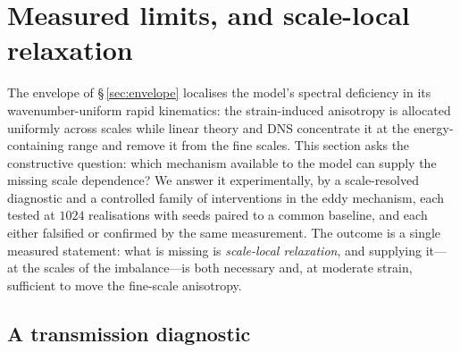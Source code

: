 \documentclass[lineno]{JFM-FLM_Au}
\begin{document}
\section{Measured limits, and scale-local relaxation}\label{sec:limits}

The envelope of \S\,\ref{sec:envelope} localises the model's spectral
deficiency in its wavenumber-uniform rapid kinematics: the strain-induced
anisotropy is allocated uniformly across scales while linear theory and
DNS concentrate it at the energy-containing range and remove it from the
fine scales. This section asks the constructive question: which mechanism
available to the model can supply the missing scale dependence? We answer
it experimentally, by a scale-resolved diagnostic and a controlled family
of interventions in the eddy mechanism, each tested at $1024$
realisations with seeds paired to a common baseline, and each either
falsified or confirmed by the same measurement. The outcome is a single
measured statement: what is missing is \emph{scale-local relaxation}, and
supplying it---at the scales of the imbalance---is both necessary and, at
moderate strain, sufficient to move the fine-scale anisotropy.

\subsection{A transmission diagnostic}\label{sec:transmission}
\end{document}
